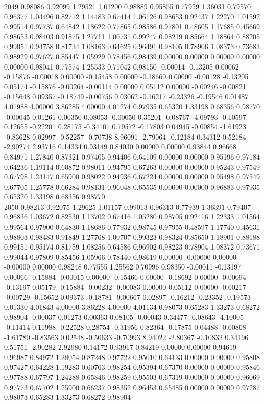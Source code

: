 {2049 0.98086 0.92099 1.29521 1.01200 0.98889 0.95855 0.77929 1.36031 0.79570 0.96377 1.04496 0.82712 1.14483 0.67414 1.06126 0.98653 0.92437 1.22270 1.01592 0.99514 0.97737 0.64842 1.18622 0.77865 0.98586 0.97801 0.48605 1.17685 0.45669 0.98653 0.98403 0.91875 1.27711 1.00731 0.99247 0.98219 0.85664 1.18864 0.88205 0.99051 0.94758 0.81734 1.08163 0.64625 0.96491 0.98105 0.78906 1.08373 0.73683 0.98929 0.97627 0.85447 1.05929 0.78456 0.98439 0.00000 0.00000 0.00000 0.00000 0.00000 0.98041 0.77574 1.25533 0.71042 0.98150 -0.00014 -0.13205 0.00062 -0.15876 -0.00018 0.00000 -0.15458 0.00000 -0.18660 0.00000 -0.00128 -0.13205 0.05174 -0.15876 -0.00264 -0.00114 0.00000 0.05112 0.00000 -0.00246 -0.00821 -0.15648 0.09357 -0.18749 -0.00756 0.03062 -0.16217 -0.23326 -0.19546 0.01487 4.01988 4.00000 3.86285 4.00000 4.01274 0.97935 0.65320 1.33198 0.68356 0.98770 -0.00045 0.01261 0.00350 0.08053 -0.00050 0.35201 -0.08767 -4.09793 -0.10597 0.12655 -0.22201 0.28175 -0.34101 0.79572 -0.17803 0.04945 -0.00854 -1.61923 -0.83628 0.02997 -0.52257 -0.70738 8.96091 -2.79064 -0.12184 0.34312 0.52184 -2.90274 2.93716 0.14334 0.93149 0.84030 0.00000 0.00000 0.93844 0.96668 0.84971 1.27840 0.87321 0.97405 0.94406 0.64109 0.00000 0.00000 0.95196 0.97184 0.64236 1.19114 0.60872 0.98011 0.94795 0.67263 0.00000 0.00000 0.95243 0.97549 0.67798 1.24147 0.65900 0.98022 0.94936 0.67224 0.00000 0.00000 0.95498 0.97549 0.67705 1.25778 0.66284 0.98131 0.96048 0.65535 0.00000 0.00000 0.96883 0.97935 0.65320 1.33198 0.68356 0.98770 \\
2050 0.98213 0.92075 1.29625 1.01157 0.99013 0.96313 0.77939 1.36391 0.79407 0.96836 1.03672 0.82530 1.13702 0.67416 1.05280 0.98705 0.92416 1.22333 1.01564 0.99564 0.97900 0.64830 1.18686 0.77932 0.98745 0.97955 0.48597 1.17740 0.45631 0.98803 0.98483 0.91849 1.27768 1.00707 0.99323 0.98324 0.85650 1.18901 0.88188 0.99151 0.95174 0.81759 1.08256 0.64586 0.96902 0.98223 0.78904 1.08372 0.73671 0.99044 0.97809 0.85456 1.05966 0.78440 0.98619 0.00000 -0.00000 0.00000 -0.00000 0.00000 0.98248 0.77555 1.25562 0.70996 0.98350 -0.00011 -0.13197 0.00066 -0.15884 -0.00015 0.00000 -0.15466 0.00000 -0.18692 0.00000 -0.00094 -0.13197 0.05179 -0.15884 -0.00232 -0.00083 0.00000 0.05112 0.00000 -0.00217 -0.00729 -0.15652 0.09373 -0.18781 -0.00667 0.02897 -0.16212 -0.23352 -0.19573 0.01330 4.01843 4.00000 3.86228 4.00000 4.01134 0.98073 0.65283 1.33273 0.68272 0.98904 -0.00037 0.01273 0.00363 0.08105 -0.00043 0.34477 -0.08643 -4.10005 -0.11414 0.11988 -0.22528 0.28754 -0.31956 0.82364 -0.17875 0.04488 -0.00868 -1.61780 -0.83563 0.02548 -0.50633 -0.70993 8.94022 -2.80367 -0.10832 0.34196 0.51751 -2.90282 2.92980 0.14172 0.93917 0.84219 0.00000 0.00000 0.94619 0.96987 0.84972 1.28054 0.87248 0.97722 0.95010 0.64133 0.00000 0.00000 0.95808 0.97427 0.64228 1.19283 0.60763 0.98254 0.95394 0.67370 0.00000 0.00000 0.95846 0.97788 0.67797 1.24288 0.65846 0.98259 0.95503 0.67319 0.00000 0.00000 0.96069 0.97773 0.67702 1.25900 0.66237 0.98352 0.96453 0.65485 0.00000 0.00000 0.97287 0.98073 0.65283 1.33273 0.68272 0.98904 \\
}
